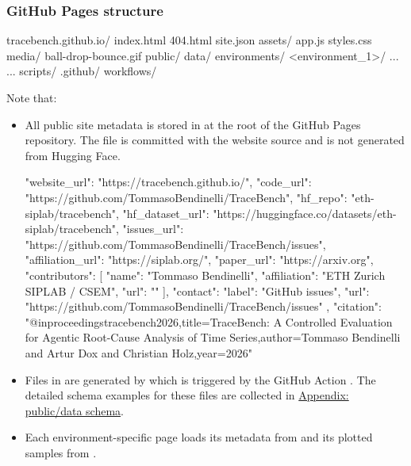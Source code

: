 \documentclass[11pt]{article}
\begin{document}
\subsubsection*{GitHub Pages structure}
\begin{LinkedDocCode}
tracebench.github.io/
  index.html
  404.html
  site.json
  assets/
    app.js
    styles.css
    media/
      ball-drop-bounce.gif
  public/
    data/
      \websiteTreeSummaryJson
      \websiteTreeLeaderboardJson
      environments/
        <environment_1>/
          \websiteTreeEnvironmentDescriptionJson
          \websiteTreeEnvironmentDataJson
          ...
      ...
  scripts/
    \websiteTreeGenerateWebsiteData
  .github/
    workflows/
      \websiteTreeDeployWorkflow
\end{LinkedDocCode}
Note that:
\begin{itemize}
  \item  All public site metadata is stored in  at the root of the GitHub Pages repository.
  The file is committed with the website source and is not generated from Hugging Face.
  \begin{DocCode}
  {
    "website_url": "https://tracebench.github.io/",
    "code_url": "https://github.com/TommasoBendinelli/TraceBench",
    "hf_repo": "eth-siplab/tracebench",
    "hf_dataset_url": "https://huggingface.co/datasets/eth-siplab/tracebench",
    "issues_url": "https://github.com/TommasoBendinelli/TraceBench/issues",
    "affiliation_url": "https://siplab.org/",
    "paper_url": "https://arxiv.org",
    "contributors": [
      {
        "name": "Tommaso Bendinelli",
        "affiliation": "ETH Zurich SIPLAB / CSEM",
        "url": ""
      }
    ],
    "contact": {
      "label": "GitHub issues",
      "url": "https://github.com/TommasoBendinelli/TraceBench/issues"
    },
    "citation": "@inproceedings{tracebench2026,\n  title={TraceBench: A Controlled Evaluation for Agentic Root-Cause Analysis of Time Series},\n  author={Tommaso Bendinelli and Artur Dox and Christian Holz},\n  year={2026}\n}"
  }
  \end{DocCode}

  \item Files in  are generated by  which is triggered by the GitHub Action .
  The detailed schema examples for these files are collected in \hyperref[sec:website-public-data-schema-appendix]{Appendix: public/data schema}.
  \item Each environment-specific page loads its metadata from  and its plotted samples from .
\end{itemize}
\end{document}
